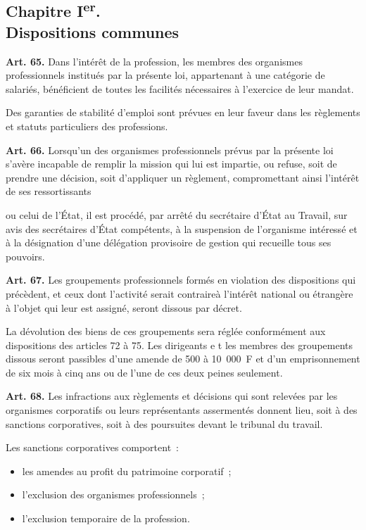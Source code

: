 \documentclass[french,twoside]{book} %
\newcommand{\labelchar}[1]{\textbf{\color{rubric} #1}}
\begin{document}
\subsection[{Chapitre Ier. Dispositions communes}]{Chapitre I\textsuperscript{er}. \\
Dispositions communes}
\noindent \labelchar{Art. 65.} Dans l’intérêt de la profession, les membres des organismes professionnels institués par la présente loi, appartenant à une catégorie de salariés, bénéficient de toutes les facilités nécessaires à l’exercice de leur mandat.\par
Des garanties de stabilité d’emploi sont prévues en leur faveur dans les règlements et statuts particuliers des professions.\par
\bigbreak
\noindent \labelchar{Art. 66.} Lorsqu’un des organismes professionnels prévus par la présente loi s’avère incapable de remplir la mission qui lui est impartie, ou refuse, soit de prendre une décision, soit d’appliquer un règlement, compromettant ainsi l’intérêt de ses ressortissants\par
ou celui de l’État, il est procédé, par arrêté du secrétaire d’État au Travail, sur avis des secrétaires d’État compétents, à la suspension de l’organisme intéressé et à la désignation d’une délégation provisoire de gestion qui recueille tous ses pouvoirs.\par
\bigbreak
\noindent \labelchar{Art. 67.} Les groupements professionnels formés en violation des dispositions qui précèdent, et ceux dont l’activité serait contraireà l’intérêt national ou étrangère à l’objet qui leur est assigné, seront dissous par décret.\par
La dévolution des biens de ces groupements sera réglée conformément aux dispositions des articles 72 à 75. Les dirigeants e t les membres des groupements dissous seront passibles d’une amende de 500 à 10 000 F et d’un emprisonnement de six mois à cinq ans ou de l’une de ces deux peines seulement.\par
\bigbreak
\noindent \labelchar{Art. 68.} Les infractions aux règlements et décisions qui sont relevées par les organismes corporatifs ou leurs représentants assermentés donnent lieu, soit à des sanctions corporatives, soit à des poursuites devant le tribunal du travail.\par
Les sanctions corporatives comportent :\par

\begin{itemize}[itemsep=0pt,]
\item les amendes au profit du patrimoine corporatif ;
\item l’exclusion des organismes professionnels ;
\item l’exclusion temporaire de la profession.
\end{itemize}
\end{document}
